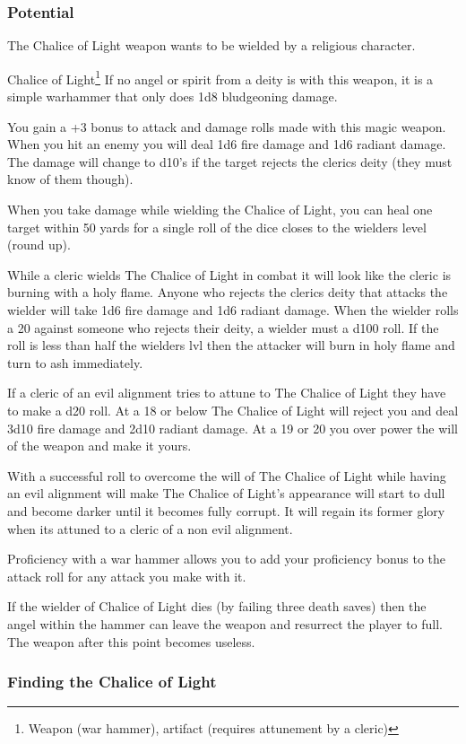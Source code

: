 \subsubsection{Potential}

The Chalice of Light weapon wants to be wielded by a religious character. 

\begin{commentbox}{Chalice of Light\footnote{Weapon (war hammer), artifact (requires attunement by a cleric)}}   
	If no angel or spirit from a deity is with this weapon, it is a simple warhammer that only does 1d8 bludgeoning damage.
	
	You gain a +3 bonus to attack and damage rolls made with this magic weapon. When you hit an enemy you will deal 1d6 fire damage and 1d6 radiant damage. The damage will change to d10's if the target rejects the clerics deity (they must know of them though).
	
	When you take damage while wielding the Chalice of Light, you can heal one target within 50 yards for a single roll of the dice closes to the wielders level (round up).
	
	While a cleric wields The Chalice of Light in combat it will look like the cleric is burning with a holy flame. Anyone who rejects the clerics deity that attacks the wielder will take 1d6 fire damage and 1d6 radiant damage. When the wielder rolls a 20 against someone who rejects their deity, a wielder must a d100 roll. If the roll is less than half the wielders lvl then the attacker will burn in holy flame and turn to ash immediately.
	
	If a cleric of an evil alignment tries to attune to The Chalice of Light they have to make a d20 roll. At a 18 or below The Chalice of Light will reject you and deal 3d10 fire damage and 2d10 radiant damage. At a 19 or 20 you over power the will of the weapon and make it yours.
	
	With a successful roll to overcome the will of The Chalice of Light while having an evil alignment will make The Chalice of Light's appearance will start to dull and become darker until it becomes fully corrupt. It will regain its former glory when its attuned to a cleric of a non evil alignment.
	
	Proficiency with a war hammer allows you to add your proficiency bonus to the attack roll for any attack you make with it.
	
	If the wielder of Chalice of Light dies (by failing three death saves) then the angel within the hammer can leave the weapon and resurrect the player to full. The weapon after this point becomes useless.
\end{commentbox}


\subsubsection{Finding the Chalice of Light}


